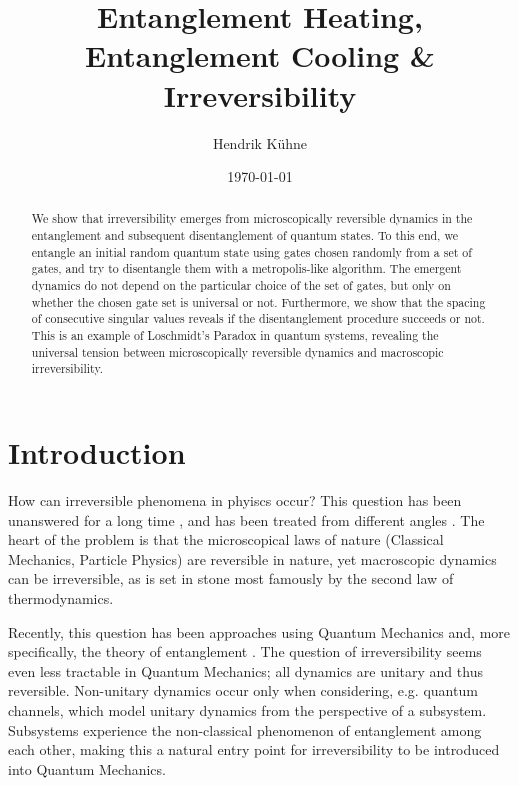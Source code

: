 \documentclass[reprint,amsmath,amssymb,aps,prb,nofootinbib]{revtex4-2}
\begin{document}
    \title{Entanglement Heating, Entanglement Cooling \& Irreversibility}
    \author{Hendrik Kühne}
    \date{\today}

    \begin{abstract}
        We show that irreversibility emerges from microscopically reversible dynamics in the entanglement
        and subsequent disentanglement of quantum states. To this end, we entangle an initial random quantum state
        using gates chosen randomly from a set of gates, and try to disentangle them with a metropolis-like
        algorithm. The emergent dynamics do not depend on the particular choice of the set of gates, but only
        on whether the chosen gate set is universal or not. Furthermore, we show that the spacing of consecutive
        singular values reveals if the disentanglement procedure succeeds or not. This is an example of Loschmidt's
        Paradox in quantum systems, revealing the universal tension between microscopically reversible dynamics
        and macroscopic irreversibility.
    \end{abstract}

    \maketitle

    \section{Introduction}

    How can irreversible phenomena in phyiscs occur? This question has been unanswered for a long time
    \cite{Loschmidt:1876:LoschmidtParadox}, and has been treated from different angles
    \cite{Haar:1955:FoundationsStatisticalMechanics,Shaffer:2014:IrreversibilityAndEntanglement}. The heart of
    the problem is that the microscopical laws of nature (Classical Mechanics, Particle Physics) are reversible
    in nature, yet macroscopic dynamics can be irreversible, as is set in stone most famously by the second law
    of thermodynamics.

    Recently, this question has been approaches using Quantum Mechanics and, more specifically, the theory of
    entanglement \cite{Shaffer:2014:IrreversibilityAndEntanglement,Odavic:2023:RandomUnitaries,Chamon:2014:EmergentIrreversibility}.
    The question of irreversibility seems even less tractable in Quantum Mechanics; all dynamics are unitary and
    thus reversible. Non-unitary dynamics occur only when considering, e.g. quantum channels, which model unitary
    dynamics from the perspective of a subsystem. Subsystems experience the non-classical phenomenon of entanglement
    among each other, making this a natural entry point for irreversibility to be introduced into Quantum Mechanics.
\end{document}
